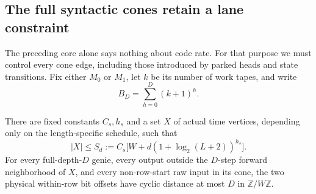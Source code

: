 \subsection{The full syntactic cones retain a lane constraint}

The preceding core alone says nothing about code rate.  For that purpose
we must control every cone edge, including those introduced by parked
heads and state transitions.  Fix either $M_0$ or $M_1$, let $k$ be its
number of work tapes, and write
\[
 B_D=\sum_{h=0}^D(k+1)^h.
\]

\begin{lemma}\label{lem:ne-lane}
\notformalized
There are fixed constants $C_s,h_s$ and a set $X$ of actual time vertices,
depending only on the length-specific schedule, such that
\[
 |X|\le S_d:=C_s\bigl[W+d(1+\log_2(L+2))^{h_s}\bigr].
\]
For every full-depth-$D$ genie, every output outside the $D$-step forward
neighborhood of $X$, and every non-row-start raw input in its cone, the
two physical within-row bit offsets have cyclic distance at most $D$
in $\mathbb Z/W\mathbb Z$.
\end{lemma}

